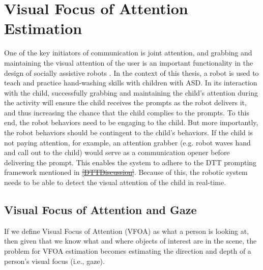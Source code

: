 \documentclass{ut-thesis}
\providecommand{\DIFaddtex}[1]{{\protect\color{blue}\uwave{#1}}} %
\providecommand{\DIFdeltex}[1]{{\protect\color{red}\sout{#1}}}                      %
\providecommand{\DIFaddbegin}{} %
\providecommand{\DIFaddend}{} %
\providecommand{\DIFdelbegin}{} %
\providecommand{\DIFdelend}{} %
\providecommand{\DIFadd}[1]{\texorpdfstring{\DIFaddtex{#1}}{#1}} %
\providecommand{\DIFdel}[1]{\texorpdfstring{\DIFdeltex{#1}}{}} %
\begin{document}
\section{Visual Focus of Attention Estimation}
One of the key initiators of communication is joint attention, and grabbing and maintaining the visual attention of the user is an important functionality in the design of socially assistive robots \cite{torta2012can}.  In the context of this thesis, a robot is used to teach and practice hand-washing skills with children with ASD.  In its interaction with the child, successfully grabbing and maintaining the child's attention during the activity will ensure the child receives the prompts as the robot delivers it, and thus increasing the chance that the child complies to the prompts.  To this end, the robot behaviors need to be engaging to the child.  But more importantly, the robot behaviors should be contingent to the child's behaviors.  If the child is not paying attention, for example, an attention grabber (e.g. robot waves hand and call out to the child) would serve as a communication opener before delivering the prompt.  This enables the system to adhere to the DTT prompting framework mentioned in \DIFdelbegin \DIFdel{\ref{DTTDiscussion}}\DIFdelend \DIFaddbegin \DIFadd{Section \ref{sec:DTTDiscussion}}\DIFaddend .  Because of this, the robotic system needs to be able to detect the visual attention of the child in real-time.

\subsection{Visual Focus of Attention and Gaze}
If we define Visual Focus of Attention (VFOA) as what a person is looking at, then given that we know what and where objects of interest are in the scene, the problem for VFOA estimation becomes estimating the direction and depth of a person's visual focus (i.e., gaze).
\end{document}
